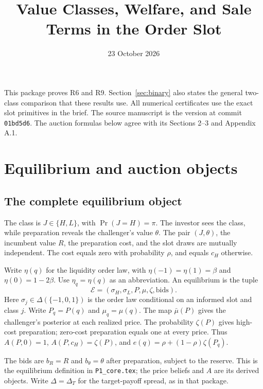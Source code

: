 \documentclass[12pt]{article}
\title{Value Classes, Welfare, and Sale Terms in the Order Slot}
\author{}\date{23 October 2026}
\begin{document}
\maketitle

This package proves R6 and R9. Section~\ref{sec:binary} also states the general two-class comparison that these results use.
All numerical certificates use the exact slot primitives in the brief.
The source manuscript is the version at commit \texttt{01bd5d6}.
The auction formulas below agree with its Sections 2--3 and Appendix A.1.

\section{Equilibrium and auction objects}\label{sec:objects}

\subsection{The complete equilibrium object}
The class is $J\in\{H,L\}$, with $\Pr(J=H)=\pi$.
The investor sees the class, while preparation reveals the challenger's value $\theta$.
The pair $(J,\theta)$, the incumbent value $R$, the preparation cost, and the slot draws are mutually independent.
The cost equals zero with probability $\rho$, and equals $c_H$ otherwise.

Write $\eta(q)$ for the liquidity order law, with $\eta(-1)=\eta(1)=\beta$ and $\eta(0)=1-2\beta$.
Use $\eta_q=\eta(q)$ as an abbreviation.
An equilibrium is the tuple
\begin{equation}\label{eq:tuple}
\mathcal E=(\sigma_H,\sigma_L,P,\mu,\zeta,\text{bids}).
\end{equation}
Here $\sigma_j\in\Delta(\{-1,0,1\})$ is the order law conditional on an informed slot and class $j$.
Write $P_q=P(q)$ and $\mu_q=\mu(q)$.
The map $\bar\mu(P)$ gives the challenger's posterior at each realized price.
The probability $\zeta(P)$ gives high-cost preparation; zero-cost preparation equals one at every price.
Thus $A(P,0)=1$, $A(P,c_H)=\zeta(P)$, and $e(q)=\rho+(1-\rho)\zeta(P_q)$.

The bids are $b_R=R$ and $b_\theta=\theta$ after preparation, subject to the reserve.
This is the equilibrium definition in \texttt{P1\_core.tex}; the price beliefs and $A$ are its derived objects.
Write $\Delta=\Delta_T$ for the target-payoff spread, as in that package.
\end{document}
